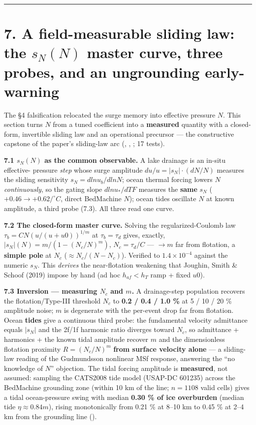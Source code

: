 \documentclass[11pt]{article}
\begin{document}
\medskip\hrule\medskip


\section*{7. A field-measurable sliding law: the $s_{N}(N)$ master curve, three probes, and an ungrounding early-warning}


The §4 falsification relocated the surge memory into effective pressure $N$. This section turns $N$ from a tuned coefficient into a \textbf{measured} quantity with a closed-form, invertible sliding law and an operational precursor — the constructive capstone of the paper's sliding-law arc (, , ; 17 tests).


\textbf{7.1 $s_{N}(N)$ as the common observable.} A lake drainage is an in-situ effective- pressure \emph{step} whose surge amplitude $du/u=|s_{N}|\cdot (dN/N)$ measures the sliding sensitivity $s_{N}=d ln u_{b}/d ln N$; ocean thermal forcing lowers $N$ \emph{continuously}, so the gating slope $d ln u_*/dTF$ measures the \textbf{same} $s_{N}$ ($+0.46\to +0.62/^{\circ}C$, direct BedMachine $N$); ocean tides oscillate $N$ at known amplitude, a third probe (7.3). All three read one curve.


\textbf{7.2 The closed-form master curve.} Solving the regularized-Coulomb law $\tau _{b}=C N (u/(u+u0))^{1/m}$ at $\tau _{b}=\tau _{d}$ gives, exactly, $|s_{N}|(N)=m/(1-(N_{c}/N)^{m})$, $N_{c}=\tau _{d}/C$ — $\to m$ far from flotation, a \textbf{simple pole} at $N_{c}$ ($\approx N_{c}/(N-N_{c})$). Verified to $1.4\times 10^{-4}$ against the numeric $s_{N}$. This \emph{derives} the near-flotation weakening that Joughin, Smith \& Schoof (2019) impose by hand (ad hoc $h_{af}<h_{T}$ ramp + fixed $u0$).


\textbf{7.3 Inversion — measuring $N_{c}$ and $m$.} A drainage-step population recovers the flotation/Type-III threshold $N_{c}$ to \textbf{0.2 / 0.4 / 1.0 \%} at 5 / 10 / 20 \% amplitude noise; $m$ is degenerate with the per-event drop far from flotation. Ocean \textbf{tides} give a continuous third probe: the fundamental velocity admittance equals $|s_{N}|$ and the 2f/1f harmonic ratio diverges toward $N_{c}$, so admittance + harmonics + the known tidal amplitude recover $m$ and the dimensionless flotation proximity $R=(N_{c}/N)^{m}$ \textbf{from surface velocity alone} — a sliding-law reading of the Gudmundsson nonlinear MSf response, answering the ``no knowledge of $N$'' objection. The tidal forcing amplitude is \textbf{measured}, not assumed: sampling the CATS2008 tide model (USAP-DC 601235) across the BedMachine grounding zone (within 10 km of the line; $n=1108$ valid cells) gives a tidal ocean-pressure swing with median \textbf{0.30 \% of ice overburden} (median tide $\eta \approx 0.84 m$), rising monotonically from 0.21 \% at 8–10 km to 0.45 \% at 2–4 km from the grounding line ().
\end{document}
